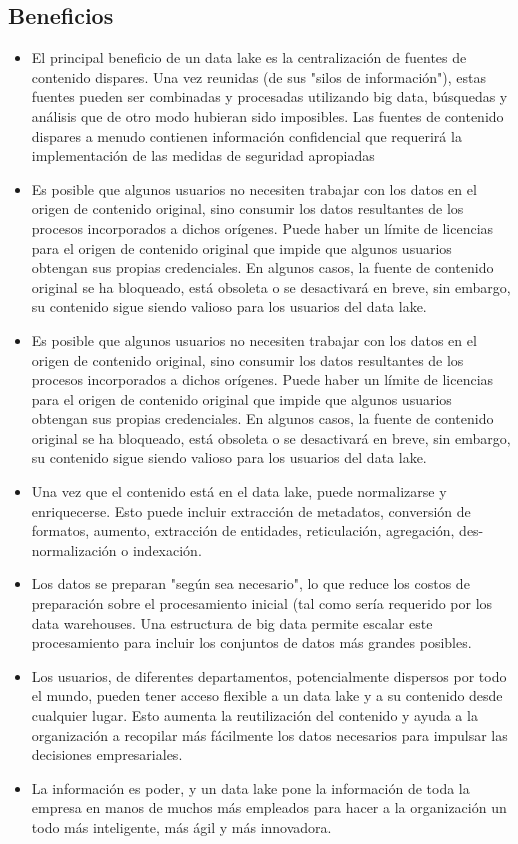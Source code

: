 \documentclass[preprint,12pt]{elsarticle}
\begin{document}
\subsection{Beneficios}
\begin{itemize}
\item El principal beneficio de un data lake es la centralización de fuentes de contenido dispares. Una vez reunidas (de sus "silos de información"), estas fuentes pueden ser combinadas y procesadas utilizando big data, búsquedas y análisis que de otro modo hubieran sido imposibles. Las fuentes de contenido dispares a menudo contienen información confidencial que requerirá la implementación de las medidas de seguridad apropiadas \\
\item Es posible que algunos usuarios no necesiten trabajar con los datos en el origen de contenido original, sino consumir los datos resultantes de los procesos incorporados a dichos orígenes. Puede haber un límite de licencias para el origen de contenido original que impide que algunos usuarios obtengan sus propias credenciales. En algunos casos, la fuente de contenido original se ha bloqueado, está obsoleta o se desactivará en breve, sin embargo, su contenido sigue siendo valioso para los usuarios del data lake.\\
\item Es posible que algunos usuarios no necesiten trabajar con los datos en el origen de contenido original, sino consumir los datos resultantes de los procesos incorporados a dichos orígenes. Puede haber un límite de licencias para el origen de contenido original que impide que algunos usuarios obtengan sus propias credenciales. En algunos casos, la fuente de contenido original se ha bloqueado, está obsoleta o se desactivará en breve, sin embargo, su contenido sigue siendo valioso para los usuarios del data lake.\\
\item Una vez que el contenido está en el data lake, puede normalizarse y enriquecerse. Esto puede incluir extracción de metadatos, conversión de formatos, aumento, extracción de entidades, reticulación, agregación, des-normalización o indexación.\\
\item Los datos se preparan "según sea necesario", lo que reduce los costos de preparación sobre el procesamiento inicial (tal como sería requerido por los data warehouses. Una estructura de big data permite escalar este procesamiento para incluir los conjuntos de datos más grandes posibles.\\
\item Los usuarios, de diferentes departamentos, potencialmente dispersos por todo el mundo, pueden tener acceso flexible a un data lake y a su contenido desde cualquier lugar. Esto aumenta la reutilización del contenido y ayuda a la organización a recopilar más fácilmente los datos necesarios para impulsar las decisiones empresariales.\\
\item La información es poder, y un data lake pone la información de toda la empresa en manos de muchos más empleados para hacer a la organización un todo más inteligente, más ágil y más innovadora.
\end{itemize}
\end{document}
